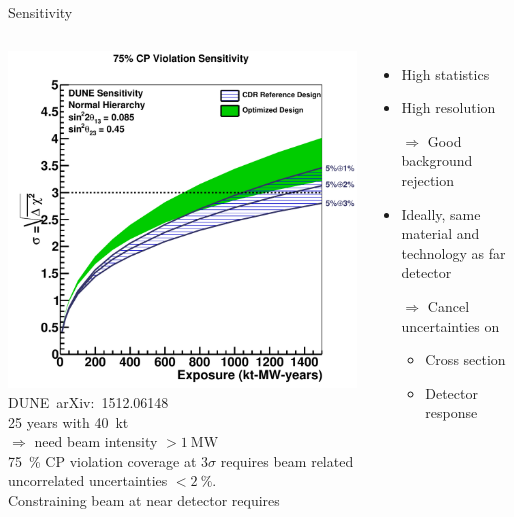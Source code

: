 \documentclass[]{beamer}
\newcommand*{\emphcol}{blue}
\newcommand*{\dune}{{DUNE}}
\begin{document}
\begin{frame}{Sensitivity}
	\begin{columns}[c]
		\centering
		\includegraphics[width=\textwidth]{dune/cpv75_exp_syst}\\
		{\tiny \dune\ arXiv:~1512.06148~\cite{dune}}\\
		\num{25} years with \SI{40}{\kilo\tonne}\\
		{\color{\emphcol} $\Rightarrow$ need beam intensity $> \SI{1}{\mega\watt}$}\\
		\SI{75}{\percent} CP violation coverage at $\num{3}\sigma$ requires beam related uncorrelated uncertainties $< \SI{2}{\percent}$.\\
		{\color{\emphcol} Constraining beam at near detector} requires
		\begin{itemize}
			\item High statistics
			\item High resolution
			\item[$\Rightarrow$] Good background rejection
			\item Ideally, same material and technology as far detector
			\item[$\Rightarrow$] Cancel uncertainties on
			\begin{itemize}
				\item Cross section
				\item Detector response
			\end{itemize}
		\end{itemize}
	\end{columns}
\end{frame}
\end{document}
